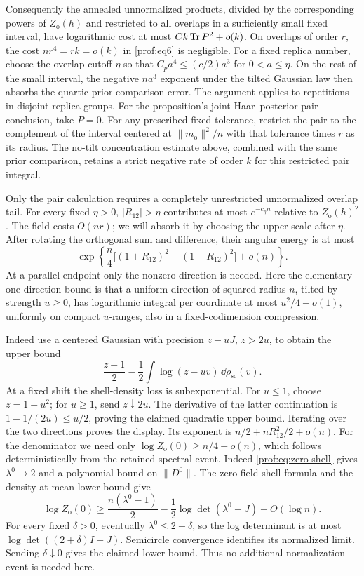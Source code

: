 Consequently the annealed unnormalized products, divided by the
corresponding powers of $Z_{\mathrm o}(h)$ and restricted to all
overlaps in a sufficiently small fixed interval, have logarithmic
cost at most $Ck\operatorname{Tr} P^2+o(k)$.  On overlaps of order $r$, the cost
$nr^4=rk=o(k)$ in \eqref{prof:eq6} is negligible. For a fixed replica
number, choose the overlap cutoff $\eta$ so that
$C_pa^4\le(c/2)a^3$ for $0<a\le\eta$. On the rest of the small interval,
the negative $na^3$ exponent under the tilted Gaussian law then
absorbs the quartic prior-comparison error. The argument applies to repetitions in disjoint
replica groups. For the proposition's joint Haar--posterior pair
conclusion, take $P=0$. For any prescribed fixed tolerance, restrict
the pair to the complement of the interval centered at
$\|m_{\mathrm o}\|^2/n$ with that tolerance times $r$ as its radius.
The no-tilt concentration estimate above, combined with the same
prior comparison, retains a strict negative rate of order $k$ for
this restricted pair integral.

Only the pair calculation requires a completely unrestricted
unnormalized overlap tail.  For every fixed $\eta>0$,
$|R_{12}|>\eta$ contributes at most $e^{-c_\eta n}$ relative to
$Z_{\mathrm o}(h)^2$. The field costs $O(nr)$; we will absorb it by
choosing the upper scale after $\eta$.
After rotating the orthogonal sum and difference, their angular
energy is at most
\[
 \exp\!\left\{
 \frac n4\bigl[(1+R_{12})^2+(1-R_{12})^2\bigr]+o(n)
 \right\}.
\]
At a parallel endpoint only the nonzero direction is needed.
Here the elementary one-direction bound is that a uniform direction
of squared radius $n$, tilted by strength $u\ge0$, has logarithmic
integral per coordinate at most $u^2/4+o(1)$, uniformly on compact
$u$-ranges, also in a fixed-codimension compression.

Indeed use a
centered Gaussian with precision $z-uJ$, $z>2u$, to obtain the upper
bound
\[
 \frac{z-1}{2}-\frac12\int\log(z-uv)\,\dd\rho_{\mathrm{sc}}(v).
\]
At a fixed shift the shell-density loss is subexponential.  For
$u\le1$, choose $z=1+u^2$; for $u\ge1$, send $z\downarrow2u$.
The derivative of the latter continuation is
$1-1/(2u)\le u/2$, proving the claimed quadratic upper bound.
Iterating over the two directions proves the display. Its exponent is
$n/2+nR_{12}^2/2+o(n)$. For the denominator we need only
$\log Z_{\mathrm o}(0)\ge n/4-o(n)$, which follows deterministically
from the retained spectral event. Indeed \eqref{prof:eq:zero-shell}
gives $\lambda^0\to2$ and a polynomial bound on $\|D^0\|$.
The zero-field shell formula and the density-at-mean lower bound give
\[
 \log Z_{\mathrm o}(0)\ge
 \frac{n(\lambda^0-1)}2
 -\frac12\log\det(\lambda^0-J)-O(\log n).
\]
For every fixed $\delta>0$, eventually $\lambda^0\le2+\delta$,
so the log determinant is at most $\log\det((2+\delta)I-J)$.
Semicircle convergence identifies its normalized limit. Sending
$\delta\downarrow0$ gives the claimed lower bound. Thus no additional
normalization event is needed here.

